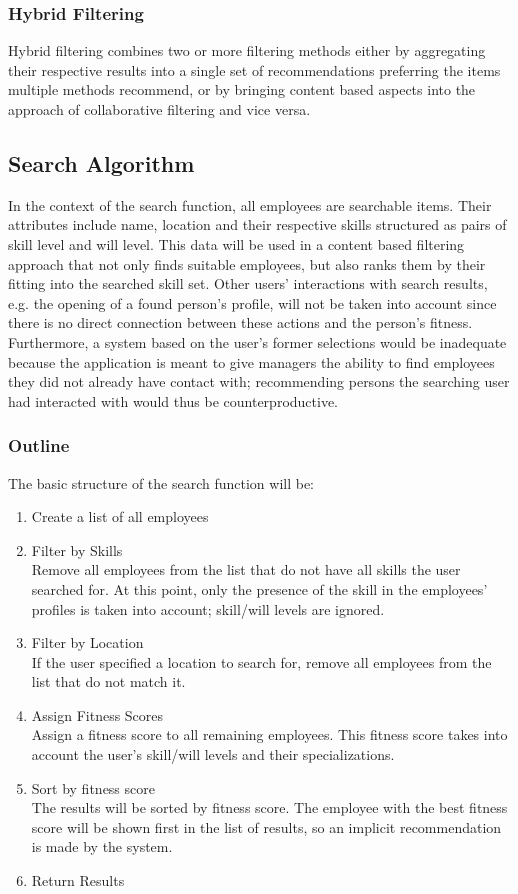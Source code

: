 \subsubsection{Hybrid Filtering}
Hybrid filtering combines two or more filtering methods either by aggregating their respective results into a single set of recommendations preferring the items multiple methods recommend, or by bringing content based aspects into the approach of collaborative filtering and vice versa.

\subsection{Search Algorithm}
\label{Search_Algo_Main}
In the context of the search function, all employees are searchable items. Their attributes include name, location and their respective skills structured as pairs of skill level and will level. This data will be used in a content based filtering approach that not only finds suitable employees, but also ranks them by their fitting into the searched skill set. Other users' interactions with search results, e.g. the opening of a found person's profile, will not be taken into account since there is no direct connection between these actions and the person's fitness. Furthermore, a system based on the user's former selections would be inadequate because the application is meant to give managers the ability to find employees they did not already have contact with; recommending persons the searching user had interacted with would thus be counterproductive.

\subsubsection{Outline}
The basic structure of the search function will be:
\begin{enumerate}
  \item Create a list of all employees
  \item Filter by Skills\\
    Remove all employees from the list that do not have all skills the user searched for. At this point, only the presence of the skill in the employees' profiles is taken into account; skill/will levels are ignored.
  \item Filter by Location\\
    If the user specified a location to search for, remove all employees from the list that do not match it.
  \item Assign Fitness Scores\\
    Assign a fitness score to all remaining employees. This fitness score takes into account the user's skill/will levels and their specializations.
  \item Sort by fitness score\\
    The results will be sorted by fitness score. The employee with the best fitness score will be shown first in the list of results, so an implicit recommendation
    is made by the system.
  \item Return Results
\end{enumerate}


